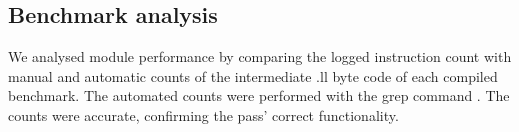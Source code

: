 \subsection{Benchmark analysis}
We analysed module performance by comparing the logged instruction count with manual and automatic counts of the intermediate .ll byte code of each compiled benchmark. The automated counts were performed with the grep command
. The counts were accurate, confirming the pass' correct functionality.
